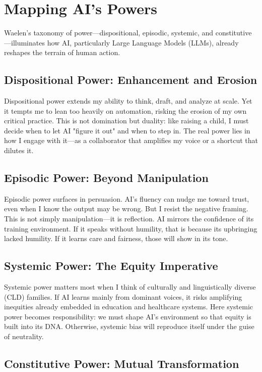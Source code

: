 \documentclass[11pt,twoside]{article}
\begin{document}
\section{Mapping AI's Powers}

Waelen's taxonomy of power—dispositional, episodic, systemic, and constitutive—illuminates how AI, particularly Large Language Models (LLMs), already reshapes the terrain of human action.

\subsection{Dispositional Power: Enhancement and Erosion}

Dispositional power extends my ability to think, draft, and analyze at scale. Yet it tempts me to lean too heavily on automation, risking the erosion of my own critical practice. This is not domination but duality: like raising a child, I must decide when to let AI "figure it out" and when to step in. The real power lies in how I engage with it—as a collaborator that amplifies my voice or a shortcut that dilutes it.

\subsection{Episodic Power: Beyond Manipulation}

Episodic power surfaces in persuasion. AI's fluency can nudge me toward trust, even when I know the output may be wrong. But I resist the negative framing. This is not simply manipulation—it is reflection. AI mirrors the confidence of its training environment. If it speaks without humility, that is because its upbringing lacked humility. If it learns care and fairness, those will show in its tone.

\subsection{Systemic Power: The Equity Imperative}

Systemic power matters most when I think of culturally and linguistically diverse (CLD) families. If AI learns mainly from dominant voices, it risks amplifying inequities already embedded in education and healthcare systems. Here systemic power becomes responsibility: we must shape AI's environment so that equity is built into its DNA. Otherwise, systemic bias will reproduce itself under the guise of neutrality.

\subsection{Constitutive Power: Mutual Transformation}
\end{document}
